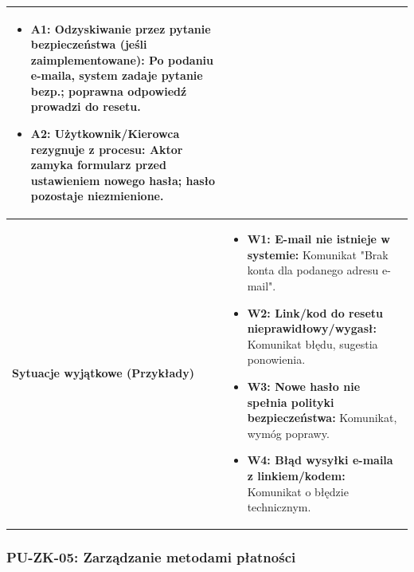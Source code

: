 \documentclass[a4paper,12pt]{article}
\begin{document}
\begin{longtable}{|p{\pierwszakolumnaszerokoscPUZKOdzysk}|p{\drugakolumnaszerokoscPUZKOdzysk}|}
\begin{itemize}
            \item \textbf{A1: Odzyskiwanie przez pytanie bezpieczeństwa (jeśli zaimplementowane):} Po podaniu e-maila, system zadaje pytanie bezp.; poprawna odpowiedź prowadzi do resetu.
            \item \textbf{A2: Użytkownik/Kierowca rezygnuje z procesu:} Aktor zamyka formularz przed ustawieniem nowego hasła; hasło pozostaje niezmienione.
        \end{itemize} \\
    \hline
    \textbf{Sytuacje wyjątkowe (Przykłady)} & 
        \begin{itemize} \itemsep0pt \parskip0pt \parsep0pt
            \item \textbf{W1: E-mail nie istnieje w systemie:} Komunikat "Brak konta dla podanego adresu e-mail".
            \item \textbf{W2: Link/kod do resetu nieprawidłowy/wygasł:} Komunikat błędu, sugestia ponowienia.
            \item \textbf{W3: Nowe hasło nie spełnia polityki bezpieczeństwa:} Komunikat, wymóg poprawy.
            \item \textbf{W4: Błąd wysyłki e-maila z linkiem/kodem:} Komunikat o błędzie technicznym.
        \end{itemize} \\
\end{longtable}
\endgroup




\subsubsection{PU-ZK-05: Zarządzanie metodami płatności}

\begingroup %
\small %
\renewcommand{\arraystretch}{1.3} %

\newlength{\pierwszakolumnaszerokoscPUZKPlat} 
\setlength{\pierwszakolumnaszerokoscPUZKPlat}{4.2cm} 

\newlength{\drugakolumnaszerokoscPUZKPlat} 
\setlength{\drugakolumnaszerokoscPUZKPlat}{\dimexpr\textwidth-\pierwszakolumnaszerokoscPUZKPlat-2\tabcolsep-3\arrayrulewidth\relax}
\end{document}
